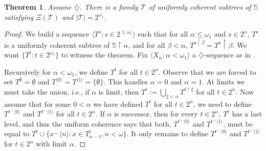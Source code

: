 \documentclass[10pt,a4paper]{amsart}
\newtheorem{theorem}{Theorem}[section]
\theoremstyle{definition}
\newcommand{\es}{\emptyset}
\newcommand{\res}{\!\upharpoonright\!}
\newcommand{\tup}[1]{\langle#1\rangle}
\newcommand{\1}{\mathbf{1}}
\newcommand{\dia}{\diamondsuit}
\newcommand{\T}{\mathcal{T}}
\newcommand{\prop}{\Xi}
\renewcommand{\S}{\mathbb{S}}
\begin{document}
\begin{theorem}\label{thm:existence}
  Assume $\dia$. There is a family $\T$ of uniformly coherent
  subtrees of $\S$ satisfying $\prop(\T)$ and $|\T| = 2^{\omega_{1}}$.
\end{theorem}

\begin{proof}
  We build a sequence $\tup{T^{s} : s \in 2^{\le\omega_{1}}}$
  such that for all $\alpha \le \omega_{1}$ and $s \in 2^{\alpha}$,
  $T^{s}$ is a uniformly coherent subtree of $\S \res \alpha$,
  and for all $\beta < \alpha$, $T^{s\res\beta} = T^{s}\res\beta$.
  We want $\{T^{t} : t \in 2^{\omega_{1}}\}$ to witness the theorem.
  Fix $\tup{X_{\alpha} : \alpha < \omega_{1}}$
  a $\dia$-sequence as in .

  Recursively for $\alpha < \omega_{1}$, we define
  $T^{t}$ for all $t \in 2^{\alpha}$. Observe that we are forced
  to set $T^{\es} = \es$ and $T^{\tup{0}} = T^{\tup{1}} = \{\es\}$. This handles
  $\alpha = 0$ and $\alpha = 1$. At
  limits we must take the union, i.e., if $\alpha$ is limit, then
  $T^{t} := \bigcup_{\xi < \alpha}T^{t\res \xi}$ for all $t \in 2^{\alpha}$.
  Now assume that for some $0 < \alpha$
  we have defined $T^{t}$ for all $t \in 2^{\alpha}$, we need to define
  $T^{t^{\frown}\tup{0}}$ and $T^{t^{\frown}\tup{1}}$ for all $t \in 2^{\alpha}$.
  If $\alpha$ is successor, then for every $t \in 2^{\alpha}$,
  $T^{t}$ has a last level, and thus the uniform coherence
  says that both, $T^{t^{\frown}\tup{0}}$ and $T^{t^{\frown}\tup{1}}$,
  must be equal to $T^{t} \cup
  \{x^{\frown}\tup{n} : x \in T^{t}_{\alpha-1}, n < \omega\}$.
  It only remains to define
  $T^{t^{\frown}\tup{0}}$ and $T^{t^{\frown}\tup{1}}$
  for $t \in 2^{\alpha}$ with limit $\alpha$.


\end{proof}
\end{document}
